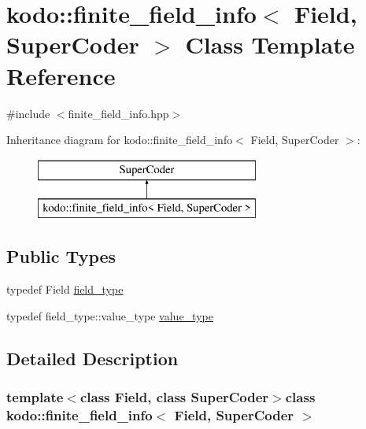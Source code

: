 \hypertarget{classkodo_1_1finite__field__info}{\section{kodo\-:\-:finite\-\_\-field\-\_\-info$<$ Field, Super\-Coder $>$ Class Template Reference}
\label{classkodo_1_1finite__field__info}
}


{\ttfamily \#include $<$finite\-\_\-field\-\_\-info.\-hpp$>$}

Inheritance diagram for kodo\-:\-:finite\-\_\-field\-\_\-info$<$ Field, Super\-Coder $>$\-:\begin{figure}[H]
\begin{center}
\leavevmode
\includegraphics[height=2.000000cm]{classkodo_1_1finite__field__info}
\end{center}
\end{figure}
\subsection*{Public Types}
\begin{DoxyCompactItemize}
\item 
typedef Field \hyperlink{classkodo_1_1finite__field__info_a7ca3137d048247ff0bc610876c790a5a}{field\-\_\-type}
\begin{DoxyCompactList}\small\item\em \end{DoxyCompactList}\item 
typedef field\-\_\-type\-::value\-\_\-type \hyperlink{classkodo_1_1finite__field__info_a3aeb5493ec7d3781415dbcbbbef5ef85}{value\-\_\-type}
\begin{DoxyCompactList}\small\item\em \end{DoxyCompactList}\end{DoxyCompactItemize}


\subsection{Detailed Description}
\subsubsection*{template$<$class Field, class Super\-Coder$>$class kodo\-::finite\-\_\-field\-\_\-info$<$ Field, Super\-Coder $>$}

